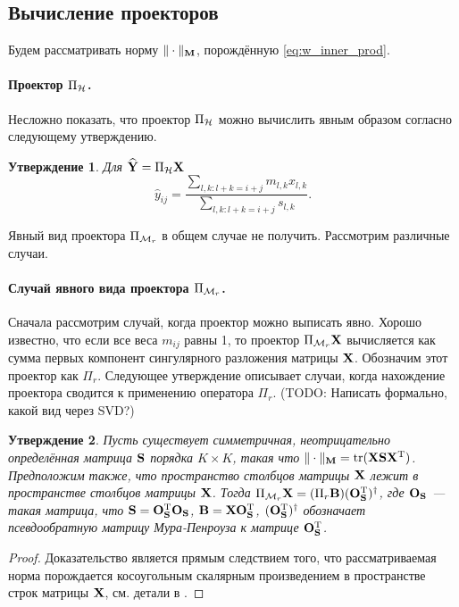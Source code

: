 \documentclass[12pt,a4paper,fleqn,leqno]{article}
\DeclareMathOperator{\tr}{tr}
\newtheorem{proposition}{Утверждение}%
\begin{document}
\subsection{Вычисление проекторов}

Будем рассматривать норму $\|\cdot\|_{\mathbf{M}}$, порождённую \eqref{eq:w_inner_prod}.

\paragraph{Проектор $\Pi_{\mathcal{H}}$.} Несложно показать, что проектор $\Pi_{\mathcal{H}}$
можно вычислить явным образом согласно следующему утверждению.

\begin{proposition}
Для $\widehat{\mathbf{Y}}=\Pi_{\mathcal{H}} \mathbf{X}$
\begin{equation*}
\hat{y}_{ij} = \frac{\sum_{l,k: l+k=i+j} m_{l,k} x_{l,k}}{\sum_{l,k: l+k=i+j} s_{l,k}}.
\end{equation*}
\end{proposition}

Явный вид проектора $\Pi_{\mathcal{M}_r}$ в общем случае не получить.
Рассмотрим различные случаи.

\paragraph{Случай явного вида проектора $\Pi_{\mathcal{M}_r}$.} Сначала рассмотрим случай, когда проектор можно выписать явно.
Хорошо известно, что если все веса $m_{ij}$ равны 1, то проектор $\Pi_{\mathcal{M}_r} \mathbf{X}$
вычисляется как сумма первых компонент сингулярного разложения матрицы $\mathbf{X}$.
Обозначим этот проектор как $\Pi_r$.
Следующее утверждение описывает случаи, когда нахождение проектора
сводится к применению оператора $\Pi_r$.  (TODO: Написать формально, какой вид через SVD?)

\begin{proposition}
\label{prop:projS}
Пусть существует симметричная, неотрицательно определённая матрица  $\mathbf{S}$ порядка $K \times K$,
такая что $\|\cdot\|_\bfM = \tr(\bfX \bfS \bfX^\rmT)$.
Предположим также, что пространство столбцов матрицы $\mathbf{X}$ лежит в пространстве столбцов матрицы $\mathbf{X}$.
Тогда $\Pi_{\mathcal{M}_r} \mathbf{X} = (\Pi_r \mathbf{B}) (\mathbf{O}_{\mathbf{S}}^{\mathrm{T}})^\dagger$, где $\mathbf{O}_{\mathbf{S}}$ --- такая матрица, что $\mathbf{S} = \mathbf{O}_{\mathbf{S}}^{\mathrm{T}}\mathbf{O}_{\mathbf{S}}$,
$\mathbf{B} = \mathbf{X} \mathbf{O}_{\mathbf{S}}^{\mathrm{T}}$, $(\mathbf{O}_{\mathbf{S}}^{\mathrm{T}})^\dagger$ обозначает псевдообратную матрицу Мура-Пенроуза к матрице $\mathbf{O}_{\mathbf{S}}^{\mathrm{T}}$.
\end{proposition}
\begin{proof}
Доказательство является прямым следствием того, что рассматриваемая норма порождается косоугольным скалярным произведением в пространстве строк матрицы $\mathbf{X}$, см. детали в \cite{Golyandina2013}.
\end{proof}
\end{document}
